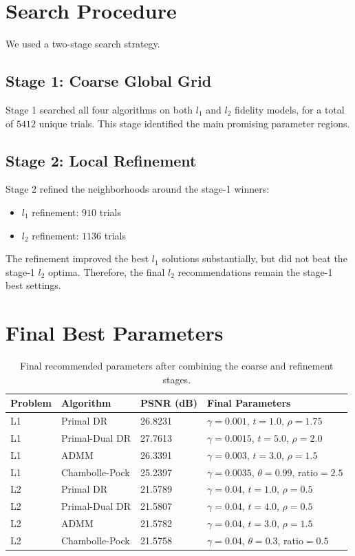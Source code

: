 \documentclass[11pt]{article}
\begin{document}
\section{Search Procedure}
We used a two-stage search strategy.

\subsection{Stage 1: Coarse Global Grid}
Stage 1 searched all four algorithms on both $l_1$ and $l_2$ fidelity models, for a total of $5412$ unique trials.
This stage identified the main promising parameter regions.

\subsection{Stage 2: Local Refinement}
Stage 2 refined the neighborhoods around the stage-1 winners:
\begin{itemize}
\item $l_1$ refinement: $910$ trials
\item $l_2$ refinement: $1136$ trials
\end{itemize}

The refinement improved the best $l_1$ solutions substantially, but did not beat the stage-1 $l_2$ optima. Therefore, the final $l_2$ recommendations remain the stage-1 best settings.

\section{Final Best Parameters}
\begin{table}[H]
\centering
\begin{tabular}{llll}
\toprule
Problem & Algorithm & PSNR (dB) & Final Parameters \\
\midrule
L1 & Primal DR & 26.8231 & $\gamma=0.001$, $t=1.0$, $\rho=1.75$ \\
L1 & Primal-Dual DR & 27.7613 & $\gamma=0.0015$, $t=5.0$, $\rho=2.0$ \\
L1 & ADMM & 26.3391 & $\gamma=0.003$, $t=3.0$, $\rho=1.5$ \\
L1 & Chambolle-Pock & 25.2397 & $\gamma=0.0035$, $\theta=0.99$, ratio$=2.5$ \\
L2 & Primal DR & 21.5789 & $\gamma=0.04$, $t=1.0$, $\rho=0.5$ \\
L2 & Primal-Dual DR & 21.5807 & $\gamma=0.04$, $t=4.0$, $\rho=0.5$ \\
L2 & ADMM & 21.5782 & $\gamma=0.04$, $t=3.0$, $\rho=1.5$ \\
L2 & Chambolle-Pock & 21.5758 & $\gamma=0.04$, $\theta=0.3$, ratio$=0.5$ \\
\bottomrule
\end{tabular}
\caption{Final recommended parameters after combining the coarse and refinement stages.}
\end{table}
\end{document}
